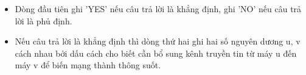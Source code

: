 \begin{itemize}
	\item     Dòng đầu tiên ghi 'YES' nếu câu trả lời là khẳng định, ghi 'NO' nếu câu trả lời là phủ định.   
	\item     Nếu câu trả lời là khẳng định thì dòng thứ hai ghi hai số nguyên dương u, v cách nhau bởi dấu cách cho biết cần bổ sung kênh truyền tin từ máy u đến máy v để biến mạng thành thông suốt.   
\end{itemize}